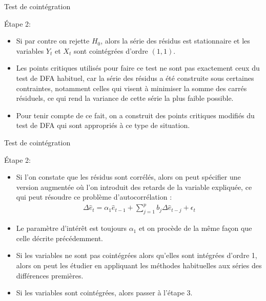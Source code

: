 \documentclass{beamer}
\begin{document}
\begin{frame}{Test de cointégration}
\begin{block}{Étape 2:}
\begin{itemize}
\item Si par contre on rejette $H_0$, alors la série des résidus est stationnaire et les variables $Y_t$ et $X_t$ sont cointégrées d’ordre $(1,1)$.
\item Les points critiques utilisés pour faire ce test ne sont pas exactement ceux du test de DFA habituel, car la série des résidus a été construite sous certaines contraintes, notamment celles qui visent à minimiser la somme des carrés résiduels, ce qui rend la variance de cette série la plus faible possible. 
\item Pour tenir compte de ce fait, on a construit des points critiques modifiés du test de DFA qui sont appropriés à ce type de situation.
\end{itemize}
\end{block}
\end{frame}

\begin{frame}{Test de cointégration}
\begin{block}{Étape 2:}
\begin{itemize}
\item Si l’on constate que les résidus sont corrélés, alors on peut spécifier une version augmentée où l’on introduit des retards de la variable expliquée, ce qui peut résoudre ce problème d’autocorrélation :
\begin{align*}
\Delta \hat{e}_t=\alpha_1 \hat{e}_{t-1}+\sum_{j=1}^p b_j \Delta \hat{e}_{t-j}+\epsilon_t
\end{align*}
\item Le paramètre d’intérêt est toujours $\alpha_1$ et on procède de la même façon que celle décrite précédemment.
\item Si les variables ne sont pas cointégrées alors qu’elles sont intégrées d’ordre 1, alors on peut les étudier en appliquant les méthodes habituelles aux séries des différences premières.
\item Si les variables sont cointégrées, alors passer à l’étape 3.
\end{itemize}
\end{block}
\end{frame}
\end{document}
